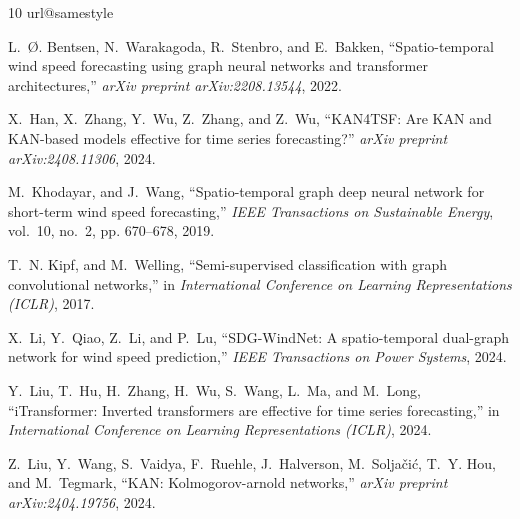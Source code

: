 \documentclass[lettersize,journal]{IEEEtran}
\begin{document}
\begin{thebibliography}{10}
\providecommand{\url}[1]{#1}
\csname url@samestyle\endcsname
\providecommand{\newblock}{\relax}
\providecommand{\bibinfo}[2]{#2}
\providecommand{\BIBentrySTDinterwordspacing}{\spaceskip=0pt\relax}
\providecommand{\BIBentryALTinterwordstretchfactor}{4}
\providecommand{\BIBentryALTinterwordspacing}{\spaceskip=\fontdimen2\font plus
\BIBentryALTinterwordstretchfactor\fontdimen3\font minus
  \fontdimen4\font\relax}
\providecommand{\BIBforeignlanguage}[2]{{%
\expandafter\ifx\csname l@#1\endcsname\relax
\typeout{** WARNING: IEEEtran.bst: No hyphenation pattern has been}%
\typeout{** loaded for the language `#1'. Using the pattern for}%
\typeout{** the default language instead.}%
\else
\language=\csname l@#1\endcsname
\fi
#2}}
\providecommand{\BIBdecl}{\relax}
\BIBdecl

L.~{\O}. Bentsen, N.~Warakagoda, R.~Stenbro, and E.~Bakken, ``Spatio-temporal wind speed forecasting using graph neural networks and transformer architectures,'' \emph{arXiv preprint arXiv:2208.13544}, 2022.

X.~Han, X.~Zhang, Y.~Wu, Z.~Zhang, and Z.~Wu, ``{KAN4TSF}: Are {KAN} and {KAN}-based models effective for time series forecasting?'' \emph{arXiv preprint arXiv:2408.11306}, 2024.

M.~Khodayar, and J.~Wang, ``Spatio-temporal graph deep neural network for short-term wind speed forecasting,'' \emph{IEEE Transactions on Sustainable Energy}, vol.~10, no.~2, pp. 670--678, 2019.

T.~N. Kipf, and M.~Welling, ``Semi-supervised classification with graph convolutional networks,'' in \emph{International Conference on Learning Representations (ICLR)}, 2017.

X.~Li, Y.~Qiao, Z.~Li, and P.~Lu, ``{SDG-WindNet}: A spatio-temporal dual-graph network for wind speed prediction,'' \emph{IEEE Transactions on Power Systems}, 2024.

Y.~Liu, T.~Hu, H.~Zhang, H.~Wu, S.~Wang, L.~Ma, and M.~Long, ``{iTransformer}: Inverted transformers are effective for time series forecasting,'' in \emph{International Conference on Learning Representations (ICLR)}, 2024.

Z.~Liu, Y.~Wang, S.~Vaidya, F.~Ruehle, J.~Halverson, M.~Solja{\v{c}}i{\'c}, T.~Y. Hou, and M.~Tegmark, ``{KAN}: Kolmogorov-arnold networks,'' \emph{arXiv preprint arXiv:2404.19756}, 2024.


\end{thebibliography}
\end{document}
